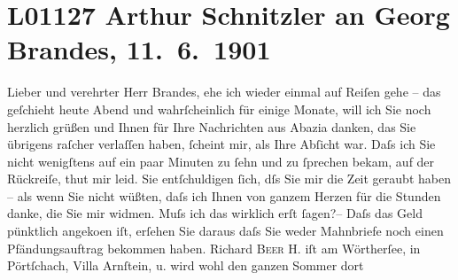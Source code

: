 

\section[Arthur Schnitzler an Georg Brandes, 11. 6. 1901]{L01127 Arthur Schnitzler an Georg Brandes, 11. 6. 1901}
\nopagebreak{}
\rehead{ }\normalsize\beginnumbering{}
\toendnotes[C]{\smallbreak\pagebreak[2]}
\toendnotes[C]{\smallbreak}
\pstart{}{\pb}Lieber und verehrter Herr Brandes,\pend\vspace{0.5em}
\pstart
           ehe ich wieder einmal auf Reiſen gehe – das geſchieht heute Abend und wahrſcheinlich
               für einige Monate, will ich Sie noch herzlich grüßen und Ihnen für Ihre Nachrichten
               aus Abazia danken, das Sie übrigens raſcher
               verlaſſen haben, ſcheint mir, als Ihre Abſicht war. Daſs ich Sie {\pb}nicht wenigſtens auf ein paar Minuten zu ſehn und
               zu ſprechen bekam, auf der Rückreiſe, thut mir leid. Sie entſchuldigen ſich, dſs Sie
               mir die Zeit geraubt haben – als wenn Sie nicht wüßten, daſs ich Ihnen von ganzem
               Herzen für die Stunden danke, die Sie mir widmen. Muſs ich das wirklich erſt ſagen?–
               Daſs das Geld pünktlich angeko{\geminationm}en iſt, erſehen Sie
               daraus {\pb}daſs Sie weder Mahnbriefe noch einen
               Pfändungsauftrag bekommen haben. Richard \textsc{Beer H.} iſt am Wörtherſee, in Pörtſchach, Villa Arnſtein, u. wird wohl den ganzen Sommer dort
